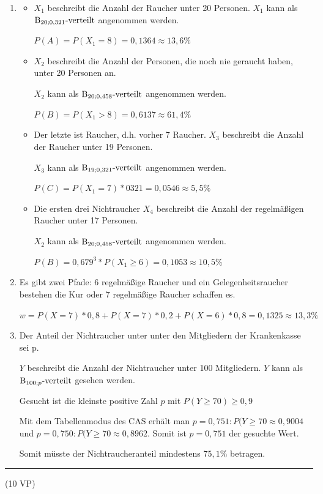 \begin{lsg}{}
	\newcommand{\bin}[1]{\ensuremath\mathrm{B}_{#1} \text{-verteilt}}
	\begin{enumerate}
		\item
		\begin{itemize}
			\item $X_1$ beschreibt die Anzahl der Raucher unter 20 Personen. $X_1$ kann als $\bin{20;0,321}$ angenommen werden.

			$P(A)=P(X_1=8)=0,1364\approx 13,6\%$
			\item $X_2$ beschreibt die Anzahl der Personen, die noch nie geraucht haben, unter 20 Personen an.

			$X_2$ kann als $\bin{20;0,458}$ angenommen werden.

			$P(B)=P(X_1>8)=0,6137\approx 61,4\%$
			\item Der letzte ist Raucher, d.h. vorher 7 Raucher. $X_3$ beschreibt die Anzahl der Raucher unter 19 Personen.

			$X_3$ kann als $\bin{19;0,321}$ angenommen werden.

			$P(C)=P(X_1=7)*0321=0,0546\approx 5,5\%$
			\item Die ersten drei Nichtraucher $X_4$ beschreibt die Anzahl der regelmäßigen Raucher unter 17 Personen.

			$X_2$ kann als $\bin{20;0,458}$ angenommen werden.

			$P(B)=0,679^3*P(X_1\geq6)=0,1053\approx 10,5\%$
		\end{itemize}
		\item Es gibt zwei Pfade: 6 regelmäßige Raucher und ein Gelegenheitsraucher bestehen die Kur oder 7 regelmäßige Raucher schaffen es.

		$w=P(X=7)*0,8+P(X=7)*0,2+P(X=6)*0,8=0,1325\approx 13,3\%$
		\item Der Anteil der Nichtraucher unter unter den Mitgliedern der Krankenkasse sei p.

		$Y$ beschreibt die Anzahl der Nichtraucher unter 100 Mitgliedern. $Y$ kann als $\bin{100;p}$ gesehen werden.

		Gesucht ist die kleinste positive Zahl $p$ mit $P(Y\geq 70)\geq 0,9$

		Mit dem Tabellenmodus des CAS erhält man $p=0,751: P(Y\geq 70\approx 0,9004$ und $p=0,750: P(Y\geq 70\approx 0,8962$. Somit ist $p=0,751$ der gesuchte Wert.

		Somit müsste der Nichtraucheranteil mindestens $75,1\%$ betragen.
	\end{enumerate}
\end{lsg}

\vfill

\hfill\rule{1.5cm}{0.4mm}

\hfill (10 VP)\hspace{0.22cm}


